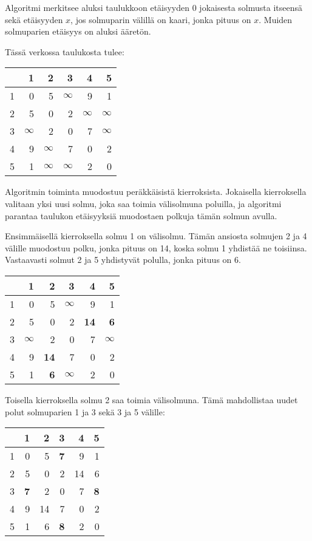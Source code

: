 Algoritmi merkitsee aluksi taulukkoon
etäisyyden 0 jokaisesta solmusta itseensä
sekä etäisyyden $x$, jos solmuparin välillä
on kaari, jonka pituus on $x$.
Muiden solmuparien etäisyys on aluksi ääretön.

Tässä verkossa taulukosta tulee:
\begin{center}
\begin{tabular}{r|rrrrr}
 & 1 & 2 & 3 & 4 & 5 \\
\hline
1 & 0 & 5 & $\infty$ & 9 & 1 \\
2 & 5 & 0 & 2 & $\infty$ & $\infty$ \\
3 & $\infty$ & 2 & 0 & 7 & $\infty$ \\
4 & 9 & $\infty$ & 7 & 0 & 2 \\
5 & 1 & $\infty$ & $\infty$ & 2 & 0 \\
\end{tabular}
\end{center}
\vspace{10pt}
Algoritmin toiminta muodostuu peräkkäisistä kierroksista.
Jokaisella kierroksella valitaan yksi uusi solmu,
joka saa toimia välisolmuna poluilla,
ja algoritmi parantaa taulukon
etäisyyksiä muodostaen polkuja tämän solmun avulla.

Ensimmäisellä kierroksella solmu 1 on välisolmu.
Tämän ansiosta solmujen 2 ja 4 välille muodostuu
polku, jonka pituus on 14,
koska solmu 1 yhdistää ne toisiinsa.
Vastaavasti solmut 2 ja 5 yhdistyvät polulla,
jonka pituus on 6.

\begin{center}
\begin{tabular}{r|rrrrr}
 & 1 & 2 & 3 & 4 & 5 \\
\hline
1 & 0 & 5 & $\infty$ & 9 & 1 \\
2 & 5 & 0 & 2 & \textbf{14} & \textbf{6} \\
3 & $\infty$ & 2 & 0 & 7 & $\infty$ \\
4 & 9 & \textbf{14} & 7 & 0 & 2 \\
5 & 1 & \textbf{6} & $\infty$ & 2 & 0 \\
\end{tabular}
\end{center}
\vspace{10pt}

Toisella kierroksella solmu 2 saa toimia välisolmuna.
Tämä mahdollistaa uudet polut solmuparien 1 ja 3
sekä 3 ja 5 välille:

\begin{center}
\begin{tabular}{r|rrrrr}
 & 1 & 2 & 3 & 4 & 5 \\
\hline
1 & 0 & 5 & \textbf{7} & 9 & 1 \\
2 & 5 & 0 & 2 & 14 & 6 \\
3 & \textbf{7} & 2 & 0 & 7 & \textbf{8} \\
4 & 9 & 14 & 7 & 0 & 2 \\
5 & 1 & 6 & \textbf{8} & 2 & 0 \\
\end{tabular}
\end{center}
\vspace{10pt}

